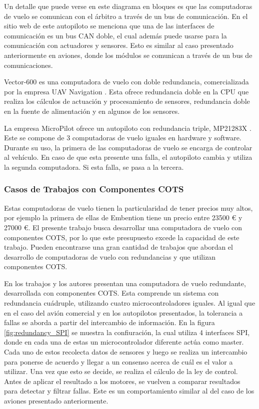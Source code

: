 
Un detalle que puede verse en este diagrama en bloques es que las computadoras de vuelo se comunican con el árbitro a través de un bus de comunicación. En el sitio web de este autopiloto se menciona que una de las interfaces de comunicación es un bus CAN doble, el cual además puede usarse para la comunicación con actuadores y sensores. Esto es similar al caso presentado anteriormente en aviones, donde los módulos se comunican a través de un bus de comunicaciones.

Vector-600 es una computadora de vuelo con doble redundancia, comercializada por la empresa UAV Navigation \cite{uav-navigation-vector-600}. Esta ofrece redundancia doble en la CPU que realiza los cálculos de actuación y procesamiento de sensores, redundancia doble en la fuente de alimentación y en algunos de los sensores.

La empresa MicroPilot ofrece un autopiloto con redundancia triple, MP21283X \cite{wwwmicropilotcom-no-date}. Este se compone de 3 computadoras de vuelo iguales en hardware y software. Durante su uso, la primera de las computadoras de vuelo se encarga de controlar al vehículo. En caso de que esta presente una falla, el autopiloto cambia y utiliza la segunda computadora. Si esta falla, se pasa a la tercera.

\subsubsection{Casos de Trabajos con Componentes COTS}

Estas computadoras de vuelo tienen la particularidad de tener precios muy altos, por ejemplo la primera de ellas de Embention tiene un precio entre 23500 \euro{} y 27000 \euro{}. El presente trabajo busca desarrollar una computadora de vuelo con componentes COTS, por lo que este presupuesto excede la capacidad de este trabajo. Pueden encontrarse una gran cantidad de trabajos que abordan el desarrollo de computadoras de vuelo con redundancias y que utilizan componentes COTS.

En los trabajos \cite{hiergeist2018implementation} y \cite{hiergeist2017internal} los autores presentan una computadora de vuelo redundante, desarrollada con componentes COTS. Esta comprende un sistema con redundancia cuádruple, utilizando cuatro microcontroladores iguales. Al igual que en el caso del avión comercial y en los autopilotos presentados, la tolerancia a fallas se aborda a partir del intercambio de información. En la figura \ref{fig:redundancy_SPI} se muestra la confiuración, la cual utiliza 4 interfaces SPI, donde en cada una de estas un microcontrolador diferente actúa como master. Cada uno de estos recolecta datos de sensores y luego se realiza un intercambio para ponerse de acuerdo y llegar a un consenso acerca de cuál es el valor a utilizar. Una vez que esto se decide, se realiza el cálculo de la ley de control. Antes de aplicar el resultado a los motores, se vuelven a comparar resultados para detectar y filtrar fallas. Este es un comportamiento similar al del caso de los aviones presentado anteriormente.

